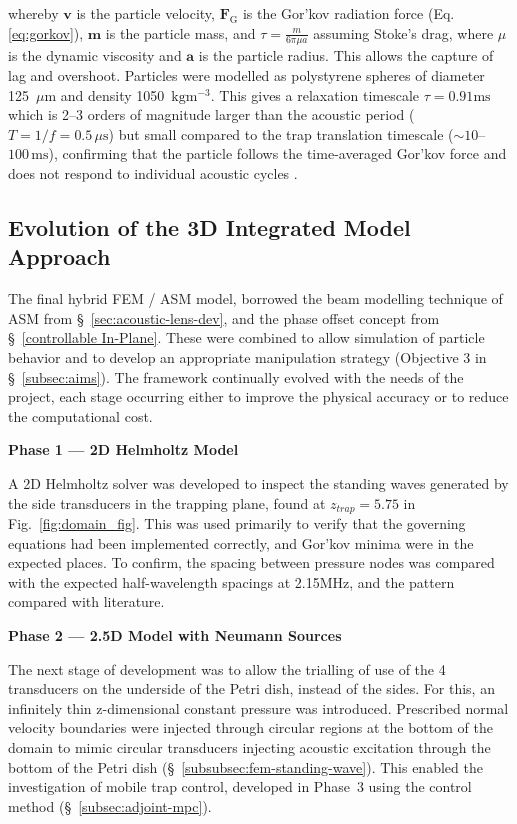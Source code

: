 \documentclass[11pt,a4paper]{article}
\newcommand{\subsubsubsection}[1]{%
  \par\medskip
  \noindent\textbf{#1}\par\nobreak\noindent\ignorespaces
}
\begin{document}
\noindent whereby $\mathbf{v}$ is the particle velocity, $\mathbf{F}_{\mathrm{G}}$ is the Gor'kov radiation force (Eq. \ref{eq:gorkov}), $\mathbf{m}$ is the particle mass, and $\tau = \frac{m}{6 \pi \mu a}$ assuming Stoke's drag, where $\mu$ is the dynamic viscosity and $\mathbf{a}$ is the particle radius. This allows the capture of lag and overshoot. Particles were modelled as polystyrene spheres of diameter 125~$\mu\text{m}$ and density 1050~$\mathrm{kgm^{-3}}$. This gives a relaxation timescale $\tau=0.91\mathrm{ms}$ which is 2--3 orders of magnitude larger than 
the acoustic period ($T = 1/f = 0.5\,\mu\mathrm{s}$) but small compared to 
the trap translation timescale ($\sim 10$--$100\,\mathrm{ms}$), confirming 
that the particle follows the time-averaged Gor'kov force and does not respond 
to individual acoustic cycles \cite{settnes2012forces}.

\subsection{Evolution of the 3D Integrated Model Approach}
\label{subsubsec:evolution-modelling}



The final  hybrid FEM / ASM model, borrowed the beam modelling technique of ASM from \S~\ref{sec:acoustic-lens-dev}, and the phase offset concept from \S~\ref{controllable In-Plane}. These were combined to allow simulation of particle behavior and to develop an appropriate manipulation strategy (Objective 3 in \S~\ref{subsec:aims}).  The framework continually evolved with the needs of the project, each stage occurring either to improve the physical accuracy or to reduce the computational cost. 

\subsubsubsection{Phase 1 — 2D Helmholtz Model}
A 2D Helmholtz solver was developed to inspect the standing waves generated by the side transducers in the trapping plane, found at $z_{trap} = 5.75$ in Fig.~\ref{fig:domain_fig}. This was used primarily to verify that the governing equations had been implemented correctly, and Gor'kov minima were in the expected places. To confirm, the spacing between pressure nodes was compared with the expected half-wavelength spacings at 2.15MHz, and the pattern compared with literature. 

\subsubsubsection{Phase 2 — 2.5D Model with Neumann Sources}
The next stage of development was to allow the trialling of use of the 4 transducers on the underside of the Petri dish, instead of the sides. For this, an infinitely thin z-dimensional constant pressure was introduced. Prescribed normal velocity boundaries were injected through circular regions at the bottom of the domain to mimic circular transducers injecting acoustic excitation through the bottom of the Petri dish (\S~\ref{subsubsec:fem-standing-wave}). This enabled the investigation of mobile trap control, developed in Phase~3 using the control method (\S~\ref{subsec:adjoint-mpc}). 
\end{document}
